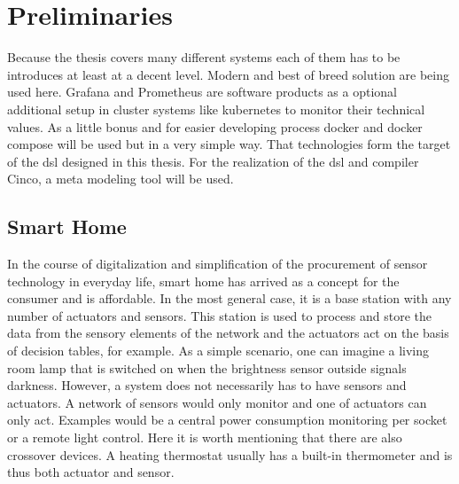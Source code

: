 \chapter{Preliminaries}
\label{chapter:grundlagen}
Because the thesis covers many different systems each of them has to be introduces at least at a decent level. Modern and best of breed solution are being used here. Grafana and Prometheus are software products as a optional additional setup in cluster systems like kubernetes to monitor their technical values. As a little bonus and for easier developing process docker and docker compose will be used but in a very simple way. That technologies form the target of the \gls{dsl} designed in this thesis. For the realization of the \gls{dsl} and compiler Cinco, a meta modeling tool will be used.
 
\section{Smart Home}
In the course of digitalization and simplification of the procurement of sensor technology in everyday life, smart home has arrived as a concept for the consumer and is affordable. In the most general case, it is a base station with any number of actuators and sensors. This station is used to process and store the data from the sensory elements of the network and the actuators act on the basis of decision tables, for example. As a simple scenario, one can imagine a living room lamp that is switched on when the brightness sensor outside signals darkness. However, a system does not necessarily has to have sensors and actuators. A network of sensors would only monitor and one of actuators can only act. Examples would be a central power consumption monitoring per socket or a remote light control.
Here it is worth mentioning that there are also crossover devices. A heating thermostat usually has a built-in thermometer and is thus both actuator and sensor.\\

